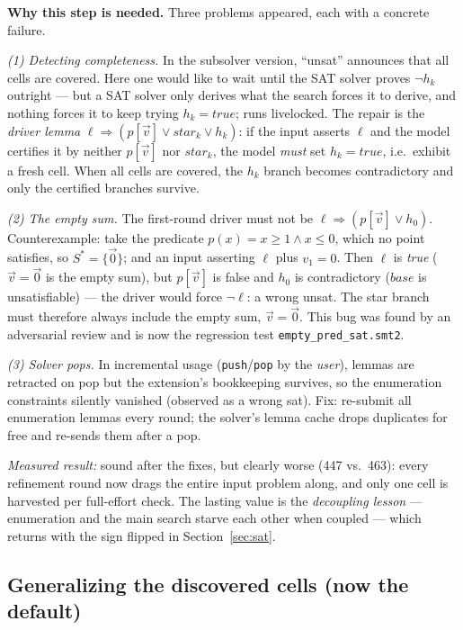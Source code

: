\documentclass[11pt]{article}
\newcommand{\Sstar}{\ensuremath{S^{*}}}
\newcommand{\vv}{\ensuremath{\vec{v}}\xspace}
\newcommand{\vzero}{\ensuremath{\vec{0}}\xspace}
\newcommand{\true}{\ensuremath{\mathit{true}}\xspace}
\newcommand{\why}[1]{\begin{whybox}\textbf{Why this step is needed.} #1\end{whybox}}
\begin{document}
\why{Three problems appeared, each with a concrete failure.

\emph{(1) Detecting completeness.} In the subsolver version,
``\textsf{unsat}'' announces that all cells are covered. Here one would
like to wait until the SAT solver proves $\neg h_k$ outright --- but a SAT
solver only derives what the search forces it to derive, and nothing forces
it to keep trying $h_k = \true$; runs livelocked. The repair is the
\emph{driver lemma}
$\ell \Rightarrow (p[\vv] \vee \mathit{star}_k \vee h_k)$:
if the input asserts $\ell$ and the model certifies it by neither
$p[\vv]$ nor $\mathit{star}_k$, the model \emph{must} set $h_k = \true$,
i.e.\ exhibit a fresh cell. When all cells are covered, the $h_k$ branch
becomes contradictory and only the certified branches survive.

\emph{(2) The empty sum.} The first-round driver must not be
$\ell \Rightarrow (p[\vv] \vee h_0)$. Counterexample: take the predicate
$p(x) = x \ge 1 \wedge x \le 0$, which no point satisfies, so
$\Sstar = \{\vzero\}$; and an input asserting $\ell$ plus $v_1 = 0$.
Then $\ell$ is \emph{true} ($\vv = \vzero$ is the empty sum), but
$p[\vv]$ is false and $h_0$ is contradictory ($\mathit{base}$ is
unsatisfiable) --- the driver would force $\neg\ell$: a wrong
\textsf{unsat}. The star branch must therefore always include the empty
sum, $\vv = \vzero$. This bug was found by an adversarial review and is
now the regression test \texttt{empty\_pred\_sat.smt2}.

\emph{(3) Solver pops.} In incremental usage (\texttt{push}/\texttt{pop}
by the \emph{user}), lemmas are retracted on pop but the extension's
bookkeeping survives, so the enumeration constraints silently vanished
(observed as a wrong \textsf{sat}). Fix: re-submit all enumeration lemmas
every round; the solver's lemma cache drops duplicates for free and
re-sends them after a pop.}

\emph{Measured result:} sound after the fixes, but clearly worse (447 vs.\
463): every refinement round now drags the entire input problem along, and
only one cell is harvested per full-effort check. The lasting value is the
\emph{decoupling lesson} --- enumeration and the main search starve each
other when coupled --- which returns with the sign flipped in
Section~\ref{sec:sat}.

\subsection{Generalizing the discovered cells (now the default)}
\end{document}
